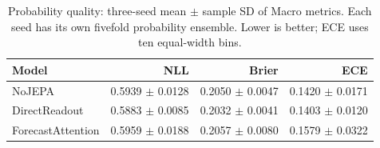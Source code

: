 \begin{table}[t]
\centering
\small
\caption{Probability quality: three-seed mean $\pm$ sample SD of Macro metrics. Each seed has its own fivefold probability ensemble. Lower is better; ECE uses ten equal-width bins.}
\label{tab:calibration}
\begin{tabular}{lrrr}
\toprule
Model & NLL & Brier & ECE \\
\midrule
NoJEPA & 0.5939 $\pm$ 0.0128 & 0.2050 $\pm$ 0.0047 & 0.1420 $\pm$ 0.0171 \\
DirectReadout & 0.5883 $\pm$ 0.0085 & 0.2032 $\pm$ 0.0041 & 0.1403 $\pm$ 0.0120 \\
ForecastAttention & 0.5959 $\pm$ 0.0188 & 0.2057 $\pm$ 0.0080 & 0.1579 $\pm$ 0.0322 \\
\bottomrule
\end{tabular}
\end{table}
